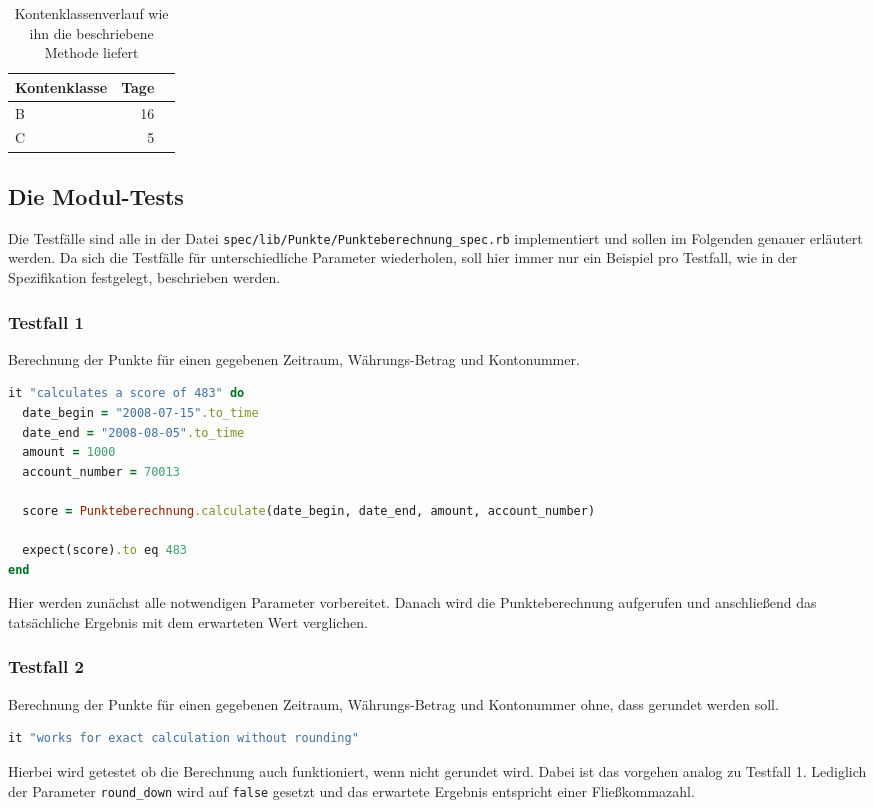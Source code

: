 \documentclass[12pt]{scrreprt}
\begin{document}
\begin{table}
  \begin{center}
    \begin{tabular}{|l|r|r|}
      \hline
      \textbf{Kontenklasse} & \textbf{Tage}\\
      \hline
      B & 16\\
      \hline
      C & 5\\
      \hline
    \end{tabular}
    \caption{Kontenklassenverlauf wie ihn die beschriebene Methode liefert}
    \label{exkklv}
  \end{center}
\end{table}
\vspace{2mm}

\subsection{Die Modul-Tests}

Die Testfälle sind alle in der Datei \verb+spec/lib/Punkte/Punkteberechnung_spec.rb+ implementiert und sollen im Folgenden genauer erläutert werden. Da sich die Testfälle für unterschiedliche Parameter wiederholen, soll hier immer nur ein Beispiel pro Testfall, wie in der Spezifikation festgelegt, beschrieben werden. \\

\subsubsection{Testfall 1}
Berechnung der Punkte für einen gegebenen Zeitraum, Währungs-Betrag und Kontonummer.
\begin{lstlisting}[language=Ruby]
it "calculates a score of 483" do
  date_begin = "2008-07-15".to_time
  date_end = "2008-08-05".to_time
  amount = 1000
  account_number = 70013

  score = Punkteberechnung.calculate(date_begin, date_end, amount, account_number)
  
  expect(score).to eq 483
end
\end{lstlisting}
Hier werden zunächst alle notwendigen Parameter vorbereitet. Danach wird die Punkteberechnung aufgerufen und anschließend das tatsächliche Ergebnis mit dem erwarteten Wert verglichen.

\subsubsection{Testfall 2}
Berechnung der Punkte für einen gegebenen Zeitraum, Währungs-Betrag und Kontonummer ohne, dass gerundet werden soll.
\begin{lstlisting}[language=Ruby]
it "works for exact calculation without rounding"
\end{lstlisting}
Hierbei wird getestet ob die Berechnung auch funktioniert, wenn nicht gerundet wird. Dabei ist das vorgehen analog zu Testfall 1. Lediglich der Parameter \verb+round_down+ wird auf \verb+false+ gesetzt und das erwartete Ergebnis entspricht einer Fließkommazahl.
\end{document}

